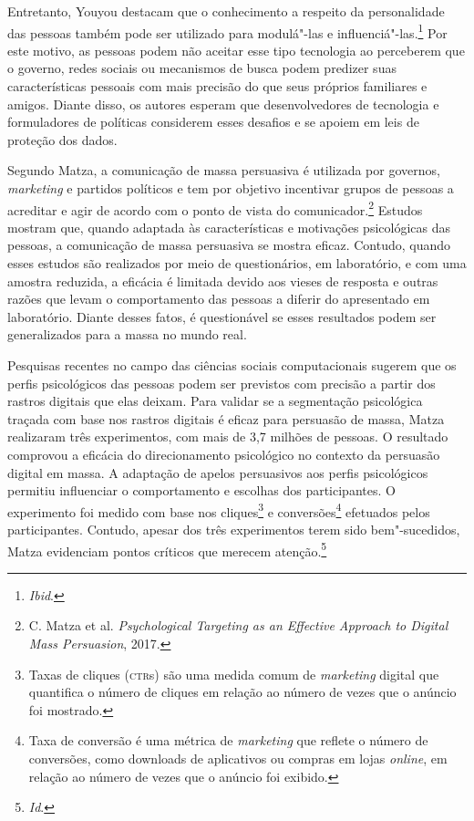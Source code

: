 Entretanto, Youyou destacam que o conhecimento a respeito
da personalidade das pessoas também pode ser utilizado para modulá"-las e
influenciá"-las.\footnote{\textit{Ibid}.} Por este motivo, as pessoas podem não aceitar esse tipo
tecnologia ao perceberem que o governo, redes sociais ou mecanismos de
busca podem predizer suas características pessoais com mais precisão do
que seus próprios familiares e amigos. Diante disso, os autores esperam
que desenvolvedores de tecnologia e formuladores de políticas considerem
esses desafios e se apoiem em leis de proteção dos dados.

Segundo Matza, a comunicação de massa persuasiva é
utilizada por governos, \textit{marketing} e partidos políticos e tem por
objetivo incentivar grupos de pessoas a acreditar e agir de acordo com o
ponto de vista do comunicador.\footnote{C. Matza et al. \textit{Psychological Targeting as an Effective Approach to Digital Mass
Persuasion}, 2017.} Estudos mostram que, quando adaptada às
características e motivações psicológicas das pessoas, a comunicação de
massa persuasiva se mostra eficaz. Contudo, quando esses estudos são
realizados por meio de questionários, em laboratório, e com uma amostra
reduzida, a eficácia é limitada devido aos vieses de resposta e outras
razões que levam o comportamento das pessoas a diferir do apresentado em
laboratório. Diante desses fatos, é questionável se esses resultados
podem ser generalizados para a massa no mundo real.

Pesquisas recentes no campo das ciências sociais computacionais sugerem
que os perfis psicológicos das pessoas podem ser previstos com precisão
a partir dos rastros digitais que elas deixam. Para validar se a
segmentação psicológica traçada com base nos rastros digitais é eficaz
para persuasão de massa, Matza realizaram três
experimentos, com mais de 3,7 milhões de pessoas. O resultado comprovou
a eficácia do direcionamento psicológico no contexto da persuasão
digital em massa. A adaptação de apelos persuasivos aos perfis
psicológicos permitiu influenciar o comportamento e escolhas dos
participantes. O experimento foi medido com base nos cliques\footnote{Taxas
  de cliques (\textsc{ctr}s) são uma medida comum de \textit{marketing} digital que
  quantifica o número de cliques em relação ao número de vezes que o
  anúncio foi mostrado.} e conversões\footnote{Taxa de conversão é uma
  métrica de \textit{marketing} que reflete o número de conversões, como
  downloads de aplicativos ou compras em lojas \textit{online}, em relação ao
  número de vezes que o anúncio foi exibido.} efetuados pelos
participantes. Contudo, apesar dos três experimentos terem sido
bem"-sucedidos, Matza evidenciam pontos críticos que merecem
atenção.\footnote{\textit{Id}.}

